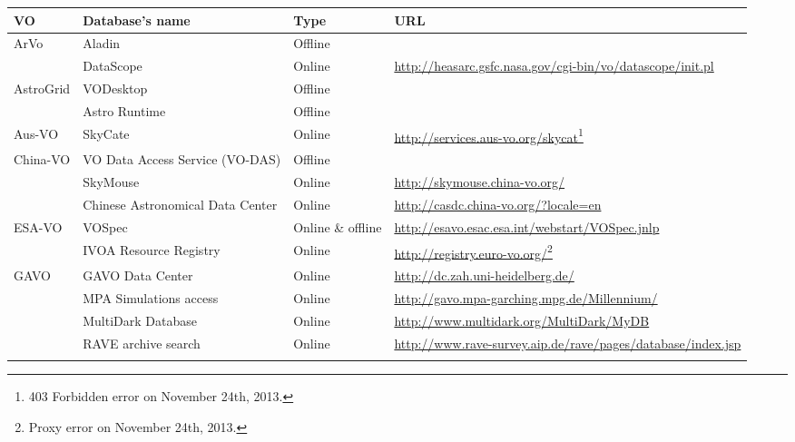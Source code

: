 \begin{center}
\begin{longtable}{|m{2cm}|m{5.5cm}|m{1.5cm}|m{5cm}|}
    \hline
    \textbf{VO} & \textbf{Database's name} & \textbf{Type} & \textbf{URL}
    \\
    \hline
    \multirow{2}{*}{ArVo} & Aladin & Offline & \\
    \cline{2-4}
     & DataScope & Online 
     & \url{http://heasarc.gsfc.nasa.gov/cgi-bin/vo/datascope/init.pl} \\
     \hline
    \multirow{2}{*}{AstroGrid} & VODesktop & Offline & \\
    \cline{2-4}
     & Astro Runtime & Offline & \\
     \hline
    Aus-VO & SkyCate & Online &
    \url{http://services.aus-vo.org/skycat}\footnote{403 Forbidden error on 
                                                     November 24th, 2013.} \\ 
    \hline
    \multirow{3}{*}{China-VO} & VO Data Access Service (VO-DAS) & Offline & \\
    \cline{2-4}
     & SkyMouse & Online & \url{http://skymouse.china-vo.org/} \\
     \cline{2-4}
     & Chinese Astronomical Data Center & Online 
     & \url{http://casdc.china-vo.org/?locale=en} \\
     \hline
    \multirow{2}{*}{ESA-VO} & VOSpec & Online \& offline &
    \url{http://esavo.esac.esa.int/webstart/VOSpec.jnlp} \\
     \cline{2-4}
     & IVOA Resource Registry & Online &
     \url{http://registry.euro-vo.org/}\footnote{Proxy error on November 24th,
                                                 2013.} \\
     \hline
    \multirow{5}{*}{GAVO} & GAVO Data Center & Online &
    \url{http://dc.zah.uni-heidelberg.de/} \\
    \cline{2-4}
     & MPA Simulations access & Online &
     \url{http://gavo.mpa-garching.mpg.de/Millennium/} \\
     \cline{2-4}
     & MultiDark Database & Online &
     \url{http://www.multidark.org/MultiDark/MyDB} \\
     \cline{2-4}
     & RAVE archive search & Online &
     \url{http://www.rave-survey.aip.de/rave/pages/database/index.jsp} \\
     \cline{2-4}

\end{longtable}
\end{center}
